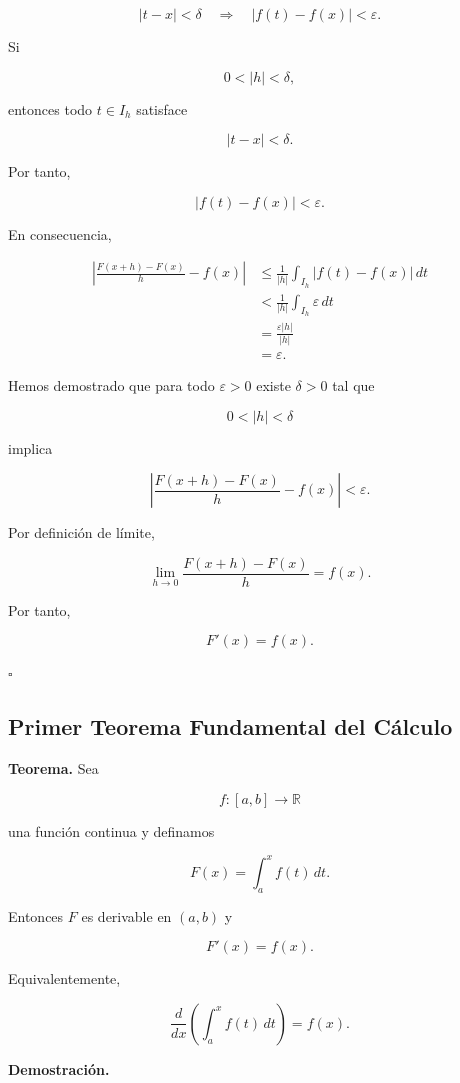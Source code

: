 \documentclass[12pt]{article}
\begin{document}
\[
|t-x|<\delta
\quad\Longrightarrow\quad
|f(t)-f(x)|<\varepsilon.
\]

Si

\[
0<|h|<\delta,
\]

entonces todo $t\in I_h$ satisface

\[
|t-x|<\delta.
\]

Por tanto,

\[
|f(t)-f(x)|<\varepsilon.
\]

En consecuencia,

\begin{align*}
\left|
\frac{F(x+h)-F(x)}{h}-f(x)
\right|
&\leq
\frac{1}{|h|}
\int_{I_h}|f(t)-f(x)|\,dt\\
&<
\frac{1}{|h|}
\int_{I_h}\varepsilon\,dt\\
&=
\frac{\varepsilon |h|}{|h|}\\
&=
\varepsilon.
\end{align*}

Hemos demostrado que para todo $\varepsilon>0$ existe $\delta>0$ tal que

\[
0<|h|<\delta
\]

implica

\[
\left|
\frac{F(x+h)-F(x)}{h}-f(x)
\right|
<\varepsilon.
\]

Por definición de límite,

\[
\lim_{h\to0}
\frac{F(x+h)-F(x)}{h}
=
f(x).
\]

Por tanto,

\[
\boxed{
F'(x)=f(x).
}
\]

\hfill$\square$
\subsection{Primer Teorema Fundamental del Cálculo}

\textbf{Teorema.}
Sea

\[
f:[a,b]\longrightarrow\mathbb{R}
\]

una función continua y definamos

\[
F(x)=\int_a^x f(t)\,dt.
\]

Entonces $F$ es derivable en $(a,b)$ y

\[
\boxed{
F'(x)=f(x).
}
\]

Equivalentemente,

\[
\boxed{
\frac{d}{dx}
\left(
\int_a^x f(t)\,dt
\right)
=
f(x).
}
\]

\textbf{Demostración.}
\end{document}
